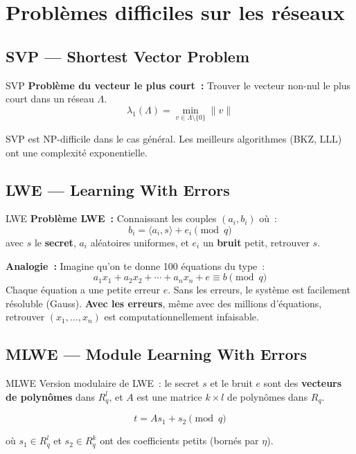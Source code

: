 \documentclass[12pt, a4paper]{article}
\begin{document}
\section{Problèmes difficiles sur les réseaux}

\subsection{SVP --- Shortest Vector Problem}

\begin{defbox}{SVP}
\textbf{Problème du vecteur le plus court~:}
Trouver le vecteur non-nul le plus court dans un réseau $\Lambda$.
$$\lambda_1(\Lambda) = \min_{v \in \Lambda \setminus \{0\}} \|v\|$$
\end{defbox}

SVP est NP-difficile dans le cas général. Les meilleurs algorithmes
(BKZ, LLL) ont une complexité exponentielle.

\subsection{LWE --- Learning With Errors}

\begin{defbox}{LWE}
\textbf{Problème LWE~:} Connaissant les couples $(a_i, b_i)$ où~:
$$b_i = \langle a_i, s \rangle + e_i \pmod{q}$$
avec $s$ le \textbf{secret}, $a_i$ aléatoires uniformes, et $e_i$ un
\textbf{bruit} petit, retrouver $s$.
\end{defbox}

\begin{importantbox}
\textbf{Analogie~:} Imagine qu'on te donne 100 équations du type~:
$$a_1 x_1 + a_2 x_2 + \cdots + a_n x_n + e \equiv b \pmod{q}$$
Chaque équation a une petite erreur $e$. Sans les erreurs, le système
est facilement résoluble (Gauss). \textbf{Avec les erreurs}, même avec
des millions d'équations, retrouver $(x_1, \ldots, x_n)$ est
computationnellement infaisable.
\end{importantbox}

\subsection{MLWE --- Module Learning With Errors}

\begin{defbox}{MLWE}
Version modulaire de LWE~: le secret $s$ et le bruit $e$ sont des
\textbf{vecteurs de polynômes} dans $R_q^l$, et $A$ est une matrice
$k \times l$ de polynômes dans $R_q$.

$$t = A s_1 + s_2 \pmod{q}$$

où $s_1 \in R_q^l$ et $s_2 \in R_q^k$ ont des coefficients petits
(bornés par $\eta$).
\end{defbox}
\end{document}
